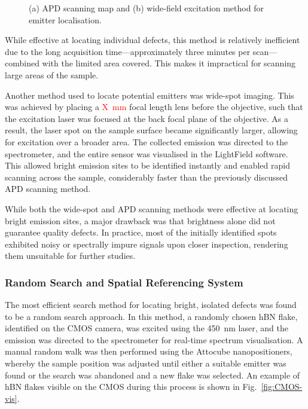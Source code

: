 \begin{figure}[h!]
    \caption{(a) APD scanning map and (b) wide-field excitation method for emitter localisation.}
    \label{fig:comparison-methods}
\end{figure}

While effective at locating individual defects, this method is relatively inefficient due to the long acquisition time—approximately three minutes per scan—combined with the limited area covered. This makes it impractical for scanning large areas of the sample. 

Another method used to locate potential emitters was wide-spot imaging. This was achieved by placing a \textcolor{red}{X~mm} focal length lens before the objective, such that the excitation laser was focused at the back focal plane of the objective. As a result, the laser spot on the sample surface became significantly larger, allowing for excitation over a broader area. The collected emission was directed to the spectrometer, and the entire sensor was visualised in the LightField software. This allowed bright emission sites to be identified instantly and enabled rapid scanning across the sample, considerably faster than the previously discussed APD scanning method.

While both the wide-spot and APD scanning methods were effective at locating bright emission sites, a major drawback was that brightness alone did not guarantee quality defects. In practice, most of the initially identified spots exhibited noisy or spectrally impure signals upon closer inspection, rendering them unsuitable for further studies.

\subsubsection{Random Search and Spatial Referencing System}

The most efficient search method for locating bright, isolated defects was found to be a random search approach. In this method, a randomly chosen hBN flake, identified on the CMOS camera, was excited using the 450~nm laser, and the emission was directed to the spectrometer for real-time spectrum visualisation. A manual random walk was then performed using the Attocube nanopositioners, whereby the sample position was adjusted until either a suitable emitter was found or the search was abandoned and a new flake was selected. An example of hBN flakes visible on the CMOS during this process is shown in Fig.~\ref{fig:CMOS-vis}.


